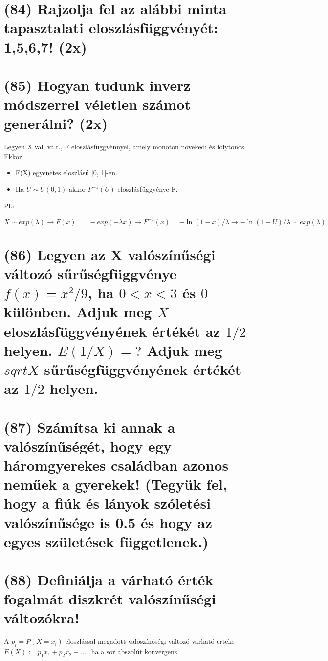 \documentclass[12p]{article}
\begin{document}
\section{(84) Rajzolja fel az alábbi minta tapasztalati eloszlásfüggvényét: 1,5,6,7! (2x)}

\section{(85) Hogyan tudunk inverz módszerrel véletlen számot generálni? (2x)}

Legyen X val. vált., F eloszlásfüggvénnyel,
amely monoton növekedı és folytonos. Ekkor

\begin{itemize}
	\item F(X) egyenetes eloszlású [0, 1]-en.
	\item Ha $U \sim U(0, 1)$ akkor $F^{-1}(U)$ eloszlásfüggvénye F.
\end{itemize}

Pl.:

$$X \sim exp(\lambda) \rightarrow F(x) = 1-exp(-\lambda x) \rightarrow F^{-1}(x) = -\ln (1-x)/\lambda \rightarrow -\ln(1-U)/\lambda \sim exp(\lambda)$$

\section{(86) Legyen az X valószínűségi változó sűrűségfüggvénye $f(x) = x^2/9$, ha $0 < x < 3$ és $0$ különben. Adjuk meg $X$ eloszlásfüggvényének értékét az $1/2$ helyen. $E(1/X)=?$ Adjuk meg $sqrt{X}$ sűrűségfüggvényének értékét az $1/2$ helyen.}

\section{(87) Számítsa ki annak a valószínűségét, hogy egy háromgyerekes családban azonos neműek a gyerekek! (Tegyük fel, hogy a fiúk és lányok szóletési valószínűsége is 0.5 és hogy az egyes születések függetlenek.)}

\section{(88) Definiálja a várható érték fogalmát diszkrét valószínűségi változókra!}

A $p_i =P (X=x_i)$ eloszlással megadott valószínőségi változó várható értéke $E(X):= p_1x_1+ p_2x_2 +...,$ ha a sor abszolút konvergens.
\end{document}
